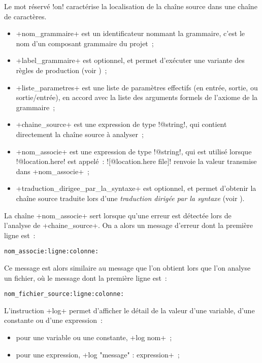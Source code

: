 Le mot réservé \ggs!on! caractérise la localisation de la chaîne source dans une chaîne de caractères.
\begin{itemize}
  \item \ggs+nom_grammaire+ est un identificateur nommant la grammaire, c'est le nom d'un composant grammaire du projet~;
  \item \ggs+label_grammaire+ est optionnel, et permet d'exécuter une variante des règles de production (voir )~;
  \item \ggs+liste_parametres+ est une liste de paramètres effectifs (en entrée, sortie, ou sortie/entrée), en accord avec la liste des arguments formels de l'axiome de la grammaire~;
  \item \ggs+chaine_source+ est une expression de type \ggs!@string!, qui contient directement la chaîne source à analyser~;
  \item \ggs+nom_associe+ est une expression de type \ggs!@string!, qui est utilisé lorsque \ggs!@location.here! est appelé~: \ggs![@location.here file]! renvoie la valeur transmise dans \ggs+nom_associe+~;
  \item \ggs+traduction_dirigee_par_la_syntaxe+ est optionnel, et permet d'obtenir la chaîne source traduite lors d'une \emph{traduction dirigée par la syntaxe} (voir ).
\end{itemize}



La chaîne \ggs+nom_associe+ sert lorsque qu'une erreur est détectée lors de l'analyse de \ggs+chaine_source+. On a alors un message d'erreur dont la première ligne est~:

\texttt{nom\_associe:ligne:colonne:}

Ce message est alors similaire au message que l'on obtient lors que l'on analyse un fichier, où le message dont la première ligne est~:

\texttt{nom\_fichier\_source:ligne:colonne:}














L'instruction \ggs+log+ permet d'afficher le détail de la valeur d'une variable, d'une constante ou d'une expression~:
\begin{itemize}
  \item pour une variable ou une constante, \ggs+log nom+~;
  \item pour une expression, \ggs+log "message" : expression+~;
\end{itemize}

